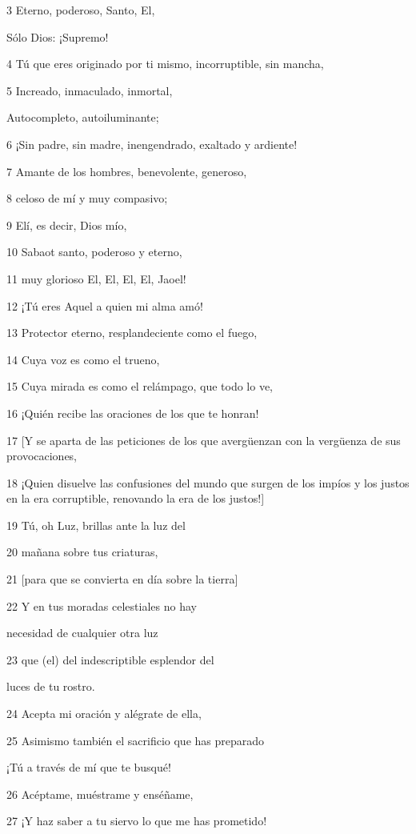 \par 3 Eterno, poderoso, Santo, El,
\par     Sólo Dios: ¡Supremo!
\par 4 Tú que eres originado por ti mismo, incorruptible, sin mancha,
\par 5 Increado, inmaculado, inmortal,
\par     Autocompleto, autoiluminante;
\par 6 ¡Sin padre, sin madre, inengendrado, exaltado y ardiente!
\par 7 Amante de los hombres, benevolente, generoso,
\par 8 celoso de mí y muy compasivo;
\par 9 Elí, es decir, Dios mío,
\par 10 Sabaot santo, poderoso y eterno,
\par 11 muy glorioso El, El, El, El, Jaoel!
\par 12 ¡Tú eres Aquel a quien mi alma amó!
\par 13 Protector eterno, resplandeciente como el fuego,
\par 14 Cuya voz es como el trueno,
\par 15 Cuya mirada es como el relámpago, que todo lo ve,
\par 16 ¡Quién recibe las oraciones de los que te honran!
\par 17 [Y se aparta de las peticiones de los que avergüenzan con la vergüenza de sus provocaciones,
\par 18 ¡Quien disuelve las confusiones del mundo que surgen de los impíos y los justos en la era corruptible, renovando la era de los justos!]
\par 19 Tú, oh Luz, brillas ante la luz del
\par 20 mañana sobre tus criaturas,
\par 21 [para que se convierta en día sobre la tierra]
\par 22 Y en tus moradas celestiales no hay
\par     necesidad de cualquier otra luz
\par 23 que (el) del indescriptible esplendor del
\par     luces de tu rostro.
\par 24 Acepta mi oración y alégrate de ella,
\par 25 Asimismo también el sacrificio que has preparado
\par     ¡Tú a través de mí que te busqué!
\par 26 Acéptame, muéstrame y enséñame,
\par 27 ¡Y haz saber a tu siervo lo que me has prometido!

